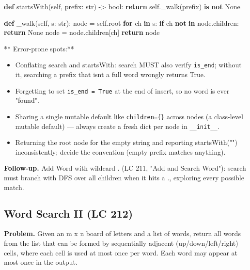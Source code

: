 \documentclass[11pt]{article}
\providecommand{\tightlist}{\setlength{\itemsep}{1pt}\setlength{\parskip}{0pt}}
\newenvironment{Shaded}{\begin{snugshade}}{\end{snugshade}}
\newcommand{\BuiltInTok}[1]{\textcolor[rgb]{0.50,0.55,0.55}{#1}}
\newcommand{\ControlFlowTok}[1]{\textcolor[rgb]{0.99,0.74,0.29}{\textbf{#1}}}
\newcommand{\KeywordTok}[1]{\textcolor[rgb]{0.81,0.81,0.76}{\textbf{#1}}}
\newcommand{\NormalTok}[1]{\textcolor[rgb]{0.81,0.81,0.76}{#1}}
\newcommand{\OperatorTok}[1]{\textcolor[rgb]{0.81,0.81,0.76}{#1}}
\newcommand{\VariableTok}[1]{\textcolor[rgb]{0.15,0.68,0.68}{#1}}
\begin{document}
\begin{Shaded}
\begin{Highlighting}[]
    \KeywordTok{def}\NormalTok{ startsWith(}\VariableTok{self}\NormalTok{, prefix: }\BuiltInTok{str}\NormalTok{) }\OperatorTok{{-}\textgreater{}} \BuiltInTok{bool}\NormalTok{:}
        \ControlFlowTok{return} \VariableTok{self}\NormalTok{.\_walk(prefix) }\KeywordTok{is} \KeywordTok{not} \VariableTok{None}

    \KeywordTok{def}\NormalTok{ \_walk(}\VariableTok{self}\NormalTok{, s: }\BuiltInTok{str}\NormalTok{):}
\NormalTok{        node }\OperatorTok{=} \VariableTok{self}\NormalTok{.root}
        \ControlFlowTok{for}\NormalTok{ ch }\KeywordTok{in}\NormalTok{ s:}
            \ControlFlowTok{if}\NormalTok{ ch }\KeywordTok{not} \KeywordTok{in}\NormalTok{ node.children:}
                \ControlFlowTok{return} \VariableTok{None}
\NormalTok{            node }\OperatorTok{=}\NormalTok{ node.children[ch]}
        \ControlFlowTok{return}\NormalTok{ node}
\end{Highlighting}
\end{Shaded}

** Error-prone spots:**

\begin{itemize}
\tightlist
\item
  Conflating search and startsWith: search MUST also verify \texttt{is\_end}; without it, searching a prefix that isn\textquotesingle t a full word wrongly returns True.
\item
  Forgetting to set \texttt{is\_end\ =\ True} at the end of insert, so no word is ever "found".
\item
  Sharing a single mutable default like \texttt{children=\{\}} across nodes (a class-level mutable default) --- always create a fresh dict per node in \texttt{\_\_init\_\_}.
\item
  Returning the root node for the empty string and reporting startsWith("") inconsistently; decide the convention (empty prefix matches anything).
\end{itemize}

\textbf{Follow-up.} Add Word with wildcard \textquotesingle.\textquotesingle{} (LC 211, "Add and Search Word"): search must branch with DFS over all children when it hits a \textquotesingle.\textquotesingle, exploring every possible match.

\subsection{Word Search II (LC 212)}\label{word-search-ii-lc-212}

\textbf{Problem.} Given an m x n board of letters and a list of words, return all words from the list that can be formed by sequentially adjacent (up/down/left/right) cells, where each cell is used at most once per word. Each word may appear at most once in the output.
\end{document}
